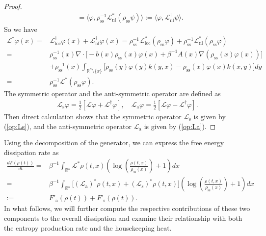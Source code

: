 \documentclass[10pt]{article}
\theoremstyle{definition}
\numberwithin{equation}{section}
\begin{document}
\begin{proof}
\begin{align*}
    &= \langle \varphi , \rho_\mathrm{ss}^{-1}\mathcal{L}_\mathrm{nl}^{*} ( \rho_\mathrm{ss}\psi ) \rangle := \langle \varphi, \mathcal{L}_\mathrm{nl}^\dagger \psi \rangle.
\end{align*}
So we have
\begin{align*}
    \mathcal{L}^\dagger \varphi(x)
    =& \mathcal{L}_\mathrm{loc}^\dagger \varphi(x) + \mathcal{L}_\mathrm{nl}^\dagger \varphi(x) = \rho_\mathrm{ss}^{-1}\mathcal{L}_\mathrm{loc}^{*} ( \rho_\mathrm{ss}\varphi ) + \rho_\mathrm{ss}^{-1}\mathcal{L}_\mathrm{nl}^{*} ( \rho_\mathrm{ss}\varphi ) \\
    =& \rho_\mathrm{ss}^{-1}(x)\nabla\cdot \Big[-b(x)\rho_\mathrm{ss}(x)\varphi(x) + \beta^{-1} A(x)\nabla (\rho_\mathrm{ss}(x)\varphi(x)) \Big]\\
    &+ \rho_\mathrm{ss}^{-1}(x)\int_{\mathbb{R}^n \setminus \{ x \} } \Big[\rho_\mathrm{ss}(y)\varphi(y)k(y,x)-\rho_\mathrm{ss}(x)\varphi(x)k(x,y) \Big] dy\\
    =& \rho_\mathrm{ss}^{-1}\mathcal{L}^{*} ( \rho_\mathrm{ss}\varphi ).
\end{align*}
The symmetric operator and the anti-symmetric operator are defined as
\begin{gather*}
    \mathcal{L}_\mathrm{s}\varphi = \frac{1}{2}\left[\mathcal{L}\varphi + \mathcal{L}^\dagger\varphi\right], \quad    \mathcal{L}_\mathrm{a}\varphi = \frac{1}{2}\left[\mathcal{L}\varphi - \mathcal{L}^\dagger\varphi\right].
\end{gather*}
Then direct calculation shows that the symmetric operator $\mathcal{L}_\mathrm{s}$ is given by (\ref{op:Ls}), and the anti-symmetric operator $\mathcal{L}_\mathrm{a}$ is given by (\ref{op:La}).
\end{proof}

Using the decomposition of the generator, we can express the free energy dissipation rate as
\begin{align*}
    \frac{dF(\rho(t))}{dt}
    =& \beta^{-1}\int_{\mathbb{R}^n} \mathcal{L}^\ast \rho(t,x) \left(\log \left( \frac{\rho(t,x)}{\rho_\mathrm{ss}(x)} \right) +1 \right) dx \\
    =& \beta^{-1}\int_{\mathbb{R}^n} \big[ (\mathcal{L}_\mathrm{a})^*\rho(t,x) + (\mathcal{L}_\mathrm{s})^*\rho(t,x) \big]\left(\log \left( \frac{\rho(t,x)}{\rho_\mathrm{ss}(x)} \right) +1 \right) dx\\
    :=& F'_\mathrm{a}(\rho(t)) + F'_\mathrm{s}(\rho(t)).
\end{align*}
In what follows, we will further compute the respective contributions of these two components to the overall dissipation and examine their relationship with both the entropy production rate and the housekeeping heat.
\end{document}
